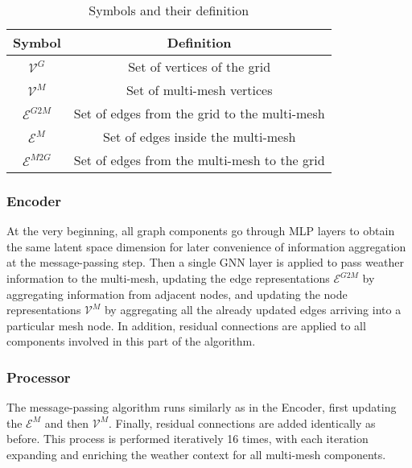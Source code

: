 \begin{table}[!ht]
    \centering
    \begin{tabular}{|c|c|}
        \hline
        Symbol & Definition \\
        \hline
        $\mathcal{V}^{G}$ & Set of vertices of the grid \\
        $\mathcal{V}^M$ & Set of multi-mesh vertices \\
        $\mathcal{E}^{G2M}$ & Set of edges from the grid to the multi-mesh \\
        $\mathcal{E}^{M}$ & Set of edges inside the multi-mesh \\
        $\mathcal{E}^{M2G}$ & Set of edges from the multi-mesh to the grid \\
        \hline 
    \end{tabular}
    \caption{Symbols and their definition}
    \label{tab:graphcast-symbols}
\end{table}

\subsubsection{Encoder} 
At the very beginning, all graph components go through MLP layers to obtain the same latent space dimension for later convenience of information aggregation at the message-passing step. Then a single GNN layer is applied to pass weather information to the multi-mesh, updating the edge representations $\mathcal{E}^{G2M}$ by aggregating information from adjacent nodes, and updating the node representations $\mathcal{V}^M$ by aggregating all the already updated edges arriving into a particular mesh node. In addition, residual connections are applied to all components involved in this part of the algorithm.

\subsubsection{Processor}
The message-passing algorithm runs similarly as in the Encoder, first updating the $\mathcal{E}^M$ and then $\mathcal{V}^M$. Finally, residual connections are added identically as before. This process is performed iteratively 16 times, with each iteration expanding and enriching the weather context for all multi-mesh components.

